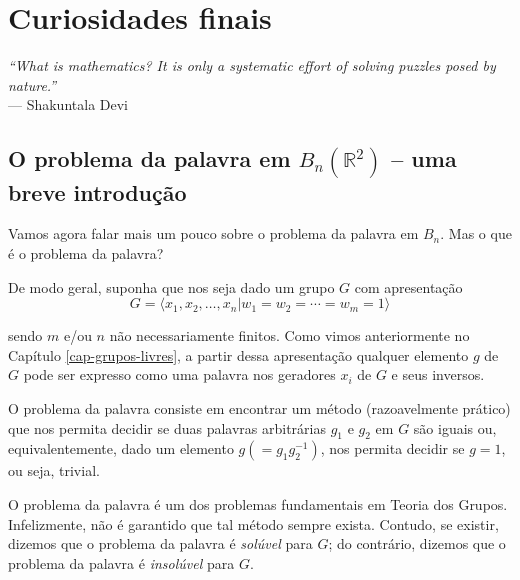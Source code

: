 \chapter[Curiosidades finais]{Curiosidades finais}
\label{cap-6}
\chaptermark{}
%
\hfill%
\begin{minipage}{10cm}
\begin{flushright}
\rightskip=0.5cm
\textit{``What is mathematics? It is only a systematic effort of solving puzzles posed by nature.''}
\\[0.1cm]
\rightskip=0.5cm
--- Shakuntala Devi
\end{flushright}
\end{minipage}

\section{O problema da palavra em \texorpdfstring{$B_n(\mathbb{R}^2)$}{BnR2} -- uma breve introdução}\label{secao o problema da palavra}
	\hspace{12pt} Vamos agora falar mais um pouco sobre o problema da palavra em $B_n$. Mas o que é o problema da palavra? 
	\par\vspace{0.3cm} De modo geral, suponha que nos seja dado um grupo $G$ com apresentação
	\begin{equation*}
	G = \langle x_1, x_2, \dots, x_n| w_1=w_2=\cdots=w_m=1 \rangle
	\end{equation*}
	\par\vspace{0.3cm} sendo $m$ e/ou $n$ não necessariamente finitos. Como vimos anteriormente no Capítulo \ref{cap-grupos-livres}, a partir dessa apresentação qualquer elemento $g$ de $G$ pode ser expresso como uma palavra nos geradores $x_i$ de $G$ e seus inversos. 
	\par\vspace{0.3cm} O problema da palavra consiste em encontrar um método (razoavelmente prático) que nos permita decidir se duas palavras arbitrárias $g_1$ e $g_2$ em $G$ são iguais ou, equivalentemente, dado um elemento $g (=g_1g_2^{-1})$, nos permita decidir se $g=1$, ou seja, trivial.
	\par\vspace{0.3cm} O problema da palavra é um dos problemas fundamentais em Teoria dos Grupos. Infelizmente, não é garantido que tal método sempre exista. Contudo, se existir, dizemos que o problema da palavra é \textit{solúvel} para $G$; do contrário, dizemos que o problema da palavra é \textit{insolúvel} para $G$.  
